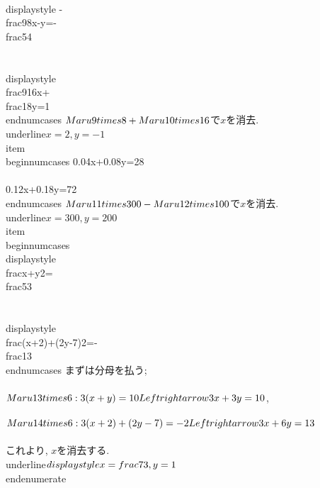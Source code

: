 		 \\displaystyle -\\frac{9}{8}x-y=-\\frac{5}{4}\\\\
		 \\displaystyle \\frac{9}{16}x+\\frac{1}{8}y=1
		\\end{numcases}
		$\\Maru{9}\\times8+\\Maru{10}\\times16$で$x$を消去.
		\\underline{$x=2,y=-1$} 
	\\item 	\\begin{numcases}{}
		 0.04x+0.08y=28\\\\
		 0.12x+0.18y=72
		\\end{numcases}
		$\\Maru{11}\\times300-\\Maru{12}\\times100$で$x$を消去.
		\\underline{$x=300,y=200$} 
	 \\item 	\\begin{numcases}{}
		 \\displaystyle \\frac{x+y}{2}=\\frac{5}{3}\\\\
		 \\displaystyle \\frac{(x+2)+(2y-7)}{2}=-\\frac{1}{3}
		\\end{numcases}
		まずは分母を払う; \\\\
		$\\Maru{13}\\times6 : 3(x+y)=10 \\Leftrightarrow 3x+3y=10$, \\\\
		$\\Maru{14}\\times6 : 3\\{(x+2)+(2y-7)\\}=-2 \\Leftrightarrow
		3x+6y=13$ \\\\
		これより, $x$を消去する. \\underline{$\\displaystyle
		x=\\frac{7}{3},y=1$}  
       \\end{enumerate}

